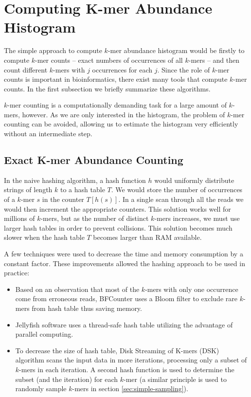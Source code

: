 \section{Computing K-mer Abundance Histogram}
\label{sec:algorithms}

The simple approach to compute $k$-mer abundance histogram would be firstly to compute $k$-mer counts --
exact numbers of occurrences of all $k$-mers -- and then count different $k$-mers with $j$ occurrences for each $j$.
Since the role of $k$-mer counts is important in bioinformatics, there exist many tools that
compute $k$-mer counts. In the first subsection we briefly summarize these algorithms.

$k$-mer counting is a computationally demanding task for a large amount of $k$-mers, however.
As we are only interested in the histogram, the problem of $k$-mer counting can be avoided,
allowing us to estimate the histogram very efficiently without an intermediate step.

\subsection{Exact K-mer Abundance Counting}
\label{sec:exact-algorithms}
In the naive hashing algorithm, a hash function $h$ would uniformly distribute strings of length $k$ to a hash table $T$. 
We would store the number of occurrences of a $k$-mer $s$ in the counter $T[h(s)]$. In a single scan through all the reads we
would then increment the appropriate counters. This solution works well for millions of $k$-mers, but as
the number of distinct $k$-mers increases, we must use larger hash tables in order to prevent collisions.
This solution becomes much slower when the hash table $T$ becomes larger than RAM available.

A few techniques were used to decrease the time and memory consumption by a constant factor. 
These improvements allowed the hashing approach to be used in practice:

\begin{itemize}
\item Based on an observation that most of the $k$-mers with only one occurrence come from erroneous reads,
BFCounter \cite{Melsted2011} uses a Bloom filter to exclude rare $k$-mers from hash table thus saving memory.

\item Jellyfish \cite{Marcais2011} software uses a thread-safe hash table utilizing the advantage of parallel computing.

\item To decrease the size of hash table, Disk Streaming of K-mers (DSK) \cite{Rizk2013} algorithm scans the input data in more
iterations, processing only a subset of $k$-mers in each iteration. A second hash function is used to determine the subset
(and the iteration) for each $k$-mer (a similar principle is used to randomly sample $k$-mers in section \ref{sec:simple-sampling}).
\end{itemize}

